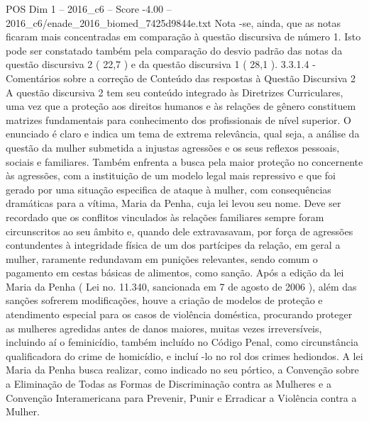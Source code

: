 \begin{textsample}{POS Dim 1 – 2016\_c6 – Score -4.00 – 2016\_c6/enade\_2016\_biomed\_7425d9844e.txt}
Nota -se, ainda, que as notas ficaram mais concentradas em comparação à questão discursiva de número 1.
Isto pode ser constatado também pela comparação do desvio padrão das notas da questão discursiva 2 ( 22,7 ) e da questão discursiva 1 ( 28,1 ). 3.3.1.4 - Comentários sobre a correção de Conteúdo das respostas à Questão Discursiva 2 A questão discursiva 2 tem seu conteúdo integrado às Diretrizes Curriculares, uma vez que a proteção aos direitos humanos e às relações de gênero constituem matrizes fundamentais para conhecimento dos profissionais de nível superior.
O enunciado é claro e indica um tema de extrema relevância, qual seja, a análise da questão da mulher submetida a injustas agressões e os seus reflexos pessoais, sociais e familiares.
Também enfrenta a busca pela maior proteção no concernente às agressões, com a instituição de um modelo legal mais repressivo e que foi gerado por uma situação especifica de ataque à mulher, com consequências dramáticas para a vítima, Maria da Penha, cuja lei levou seu nome.
Deve ser recordado que os conflitos vinculados às relações familiares sempre foram circunscritos ao seu âmbito e, quando dele extravasavam, por força de agressões contundentes à integridade física de um dos partícipes da relação, em geral a mulher, raramente redundavam em punições relevantes, sendo comum o pagamento em cestas básicas de alimentos, como sanção.
Após a edição da lei Maria da Penha ( Lei no. 11.340, sancionada em 7 de agosto de 2006 ), além das sanções sofrerem modificações, houve a criação de modelos de proteção e atendimento especial para os casos de violência doméstica, procurando proteger as mulheres agredidas antes de danos maiores, muitas vezes irreversíveis, incluindo aí o feminicídio, também incluído no Código Penal, como circunstância qualificadora do crime de homicídio, e incluí -lo no rol dos crimes hediondos.
A lei Maria da Penha busca realizar, como indicado no seu pórtico, a Convenção sobre a Eliminação de Todas as Formas de Discriminação contra as Mulheres e a Convenção Interamericana para Prevenir, Punir e Erradicar a Violência contra a Mulher.

\end{textsample}
